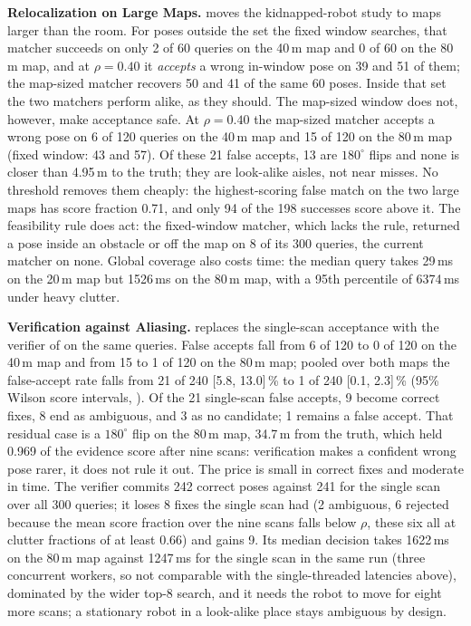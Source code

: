 \noindent\textbf{Relocalization on Large Maps.}  moves the kidnapped-robot study to maps larger than the room. For poses outside the set the fixed window searches, that matcher succeeds on only 2 of 60 queries on the 40\,m map and 0 of 60 on the 80\,m map, and at $\rho=0.40$ it \emph{accepts} a wrong in-window pose on 39 and 51 of them; the map-sized matcher recovers 50 and 41 of the same 60 poses. Inside that set the two matchers perform alike, as they should. The map-sized window does not, however, make acceptance safe. At $\rho=0.40$ the map-sized matcher accepts a wrong pose on 6 of 120 queries on the 40\,m map and 15 of 120 on the 80\,m map (fixed window: 43 and 57). Of these 21 false accepts, 13 are $180^\circ$ flips and none is closer than 4.95\,m to the truth; they are look-alike aisles, not near misses. No threshold removes them cheaply: the highest-scoring false match on the two large maps has score fraction 0.71, and only 94 of the 198 successes score above it. The feasibility rule does act: the fixed-window matcher, which lacks the rule, returned a pose inside an obstacle or off the map on 8 of its 300 queries, the current matcher on none. Global coverage also costs time: the median query takes 29\,ms on the 20\,m map but 1526\,ms on the 80\,m map, with a 95th percentile of 6374\,ms under heavy clutter.



\noindent\textbf{Verification against Aliasing.}  replaces the single-scan acceptance with the verifier of  on the same queries. False accepts fall from 6 of 120 to 0 of 120 on the 40\,m map and from 15 to 1 of 120 on the 80\,m map; pooled over both maps the false-accept rate falls from 21 of 240 [5.8, 13.0]\,\% to 1 of 240 [0.1, 2.3]\,\% (95\% Wilson score intervals, \citealt{wilson1927probable}). Of the 21 single-scan false accepts, 9 become correct fixes, 8 end as ambiguous, and 3 as no candidate; 1 remains a false accept. That residual case is a $180^\circ$ flip on the 80\,m map, 34.7\,m from the truth, which held 0.969 of the evidence score after nine scans: verification makes a confident wrong pose rarer, it does not rule it out. The price is small in correct fixes and moderate in time. The verifier commits 242 correct poses against 241 for the single scan over all 300 queries; it loses 8 fixes the single scan had (2 ambiguous, 6 rejected because the mean score fraction over the nine scans falls below $\rho$, these six all at clutter fractions of at least 0.66) and gains 9. Its median decision takes 1622\,ms on the 80\,m map against 1247\,ms for the single scan in the same run (three concurrent workers, so not comparable with the single-threaded latencies above), dominated by the wider top-8 search, and it needs the robot to move for eight more scans; a stationary robot in a look-alike place stays ambiguous by design.

